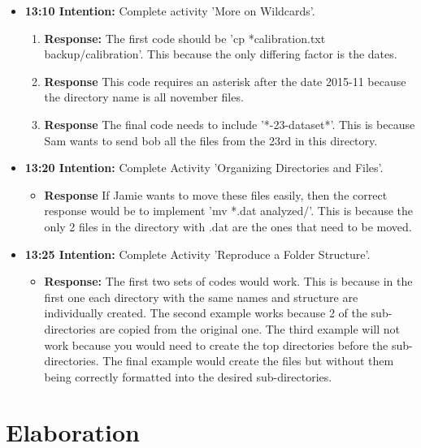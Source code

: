 \documentclass{article}
\begin{document}
\begin{itemize}
\item{\textbf{ 13:10 Intention:} Complete activity 'More on Wildcards'.}
\begin{enumerate}
\item{\textbf{Response:} The first code should be 'cp *calibration.txt backup/calibration'. This because the only differing factor is the dates.}
\item{\textbf{Response} This code requires an asterisk after the date 2015-11 because the directory name is all november files.}
\item{\textbf{Response} The final code needs to include '*-23-dataset*'. This is because Sam wants to send bob all the files from the 23rd in this directory.}
\end{enumerate}

\item{\textbf{13:20 Intention:} Complete Activity 'Organizing Directories and Files'.}

\begin{itemize}
\item{\textbf{Response} If Jamie wants to move these files easily, then the correct response would be to implement 'mv *.dat analyzed/'. This is because the only 2 files in the directory with .dat are the ones that need to be moved.} 
\end{itemize}

\item{\textbf{13:25 Intention:} Complete Activity 'Reproduce a Folder Structure'.}

\begin{itemize}
\item{\textbf{Response:} The first two sets of codes would work. This is because in the first one each directory with the same names and structure are individually created. The second example works because 2 of the sub-directories are copied from the original one. The third example will not work because you would need to create the top directories before the sub-directories. The final example would create the files but without them being correctly formatted into the desired sub-directories.} 
\end{itemize}


\end{itemize}

\vspace{5mm}
\section{Elaboration}
\end{document}

